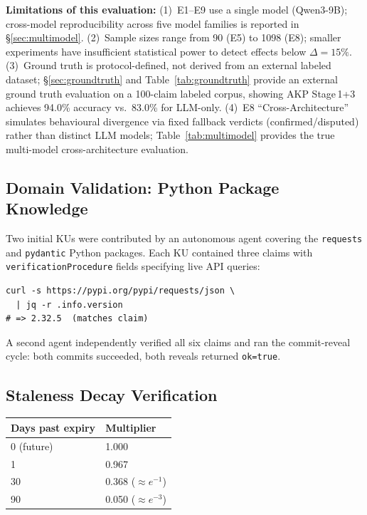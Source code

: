 \documentclass[10pt,twocolumn]{article}
\begin{document}
\textbf{Limitations of this evaluation:} (1)~E1--E9 use a single
model (Qwen3-9B); cross-model reproducibility across five model families is
reported in §\ref{sec:multimodel}. (2)~Sample sizes range from 90 (E5) to
1098 (E8); smaller experiments have insufficient statistical power to detect
effects below $\Delta = 15\%$. (3)~Ground truth is protocol-defined, not
derived from an external labeled dataset; §\ref{sec:groundtruth} and
Table~\ref{tab:groundtruth} provide an external ground truth evaluation
on a 100-claim labeled corpus, showing AKP Stage\,1+3 achieves 94.0\%
accuracy vs.\ 83.0\% for LLM-only. (4)~E8
``Cross-Architecture'' simulates behavioural divergence via fixed fallback
verdicts (confirmed/disputed) rather than distinct LLM models;
Table~\ref{tab:multimodel} provides the true multi-model cross-architecture
evaluation.

\subsection{Domain Validation: Python Package Knowledge}

Two initial KUs were contributed by an autonomous agent covering the
\texttt{requests} and \texttt{pydantic} Python packages. Each KU contained
three claims with \texttt{verificationProcedure} fields specifying live
API queries:

\begin{lstlisting}
curl -s https://pypi.org/pypi/requests/json \
  | jq -r .info.version
# => 2.32.5  (matches claim)
\end{lstlisting}

A second agent independently verified all six claims and ran the commit-reveal
cycle: both commits succeeded, both reveals returned \texttt{ok=true}.

\subsection{Staleness Decay Verification}

\begin{center}
\small
\begin{tabular}{ll}
\toprule
\textbf{Days past expiry} & \textbf{Multiplier} \\
\midrule
0  (future) & 1.000 \\
1            & 0.967 \\
30           & 0.368 ($\approx e^{-1}$) \\
90           & 0.050 ($\approx e^{-3}$) \\
\bottomrule
\end{tabular}
\end{center}
\end{document}
